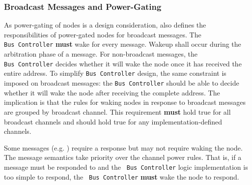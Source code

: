 \subsubsection{Broadcast Messages and Power-Gating}
As power-gating of nodes is a \bus design consideration, \bus also defines the
responsibilities of power-gated nodes for broadcast messages. The {\tt
Bus~Controller} {\bf must} wake for every message. Wakeup shall occur during
the arbitration phase of a message. For non-broadcast messages, the {\tt
Bus~Controller} decides whether it will wake the node once it has received the
entire address. To simplify {\tt Bus~Controller} design, the same constraint
is imposed on broadcast messages: the {\tt Bus~Controller} should be able to
decide whether it will wake the node after receiving the complete address.
The implication is that the rules for waking nodes in response to broadcast
messages are grouped by broadcast channel. This requirement {\bf must} hold
true for all \bus broadcast channels and should hold true for any
implementation-defined channels.

Some messages (e.g. ) require a response but may
not require waking the node. The message semantics take priority over the
channel power rules. That is, if a message must be responded to and the {\tt
Bus~Controller} logic implementation is too simple to respond, the {\tt
Bus~Controller} {\bf must} wake the node to respond.

